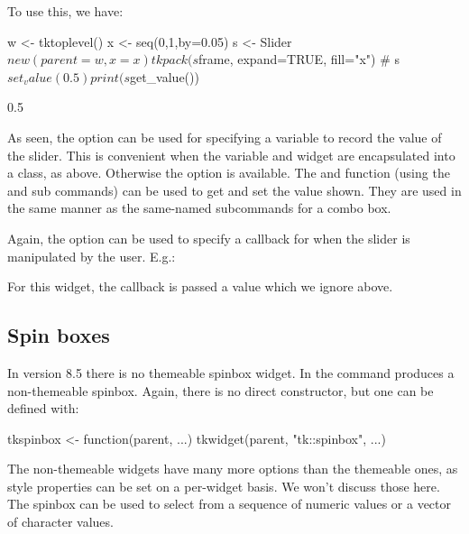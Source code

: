 To use this, we have:
\begin{Schunk}
\begin{Sinput}
 w <- tktoplevel()
 x <- seq(0,1,by=0.05)
 s <- Slider$new(parent=w, x=x)
 tkpack(s$frame, expand=TRUE, fill="x")
 #
 s$set_value(0.5)
 print(s$get_value())
\end{Sinput}
\begin{Soutput}
[1] 0.5
\end{Soutput}
\end{Schunk}

As seen, the  option can be used for
specifying a \TCL\/ variable to record the value of the slider. This
is convenient when the variable and widget are encapsulated into a
class, as above. Otherwise the  option is
available.  The  and  function (using
the  and  sub
commands) can be used to get and set the value shown. They are used in
the same manner as the same-named subcommands for a combo box.

Again, the  option can be used to specify a
callback for when the slider is manipulated by the user. E.g.:
\begin{Schunk}
\end{Schunk}
For this widget, the callback is passed a value which we ignore above.


\subsection{Spin boxes}
\label{sec:tcltk:spinboxes}

In \TK\/ version 8.5 there is no themeable spinbox widget. In \TK\/ the
 command produces a non-themeable spinbox. Again, there
is no direct  constructor, but one can be
defined with:
\begin{Schunk}
\begin{Sinput}
 tkspinbox <- function(parent, ...) 
   tkwidget(parent, "tk::spinbox", ...)
\end{Sinput}
\end{Schunk}

The non-themeable widgets have many more options than the themeable
ones, as style properties can be set on a per-widget basis. We won't
discuss those here. The spinbox can be used to select from a sequence
of numeric values or a vector of character values.


